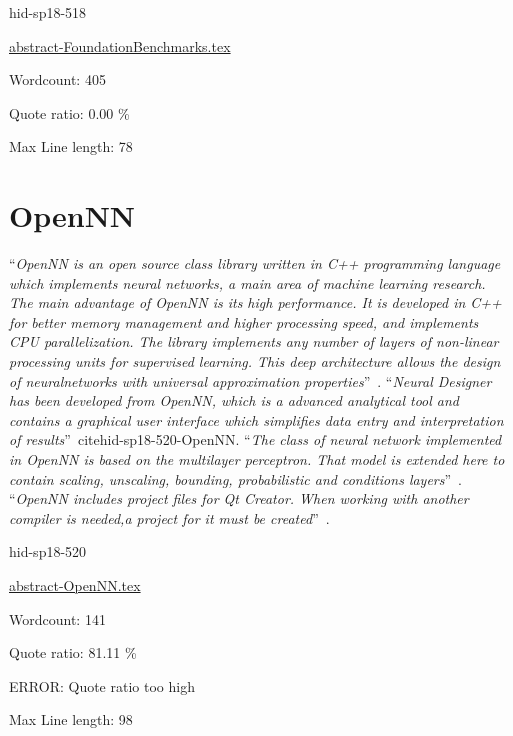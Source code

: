 \begin{IU}

hid-sp18-518

\href{https://github.com/cloudmesh-community/hid-sp18-518/blob/master//technology/abstract-FoundationBenchmarks.tex}{abstract-FoundationBenchmarks.tex}

 

Wordcount: 405


Quote ratio: 0.00 \%
 
Max Line length: 78
\end{IU}

\section{OpenNN}

\color{blue}``\emph{OpenNN is an open source class library written in C++ programming language
which implements neural networks, a main area of machine learning research.
The main advantage of OpenNN is its high performance. It is developed in 
C++ for better memory management and higher processing speed, and 
implements CPU parallelization. The library implements any number of layers
of non-linear processing units for supervised learning. This deep 
architecture allows the design of neuralnetworks with universal approximation
properties}''\color{black}~\cite{hid-sp18-520-OpenNN}.
\color{blue}``\emph{Neural Designer has been developed from OpenNN, which is a advanced analytical
tool and contains a graphical user interface which simplifies data entry
and interpretation of results}''\color{black}~cite{hid-sp18-520-OpenNN}.
\color{blue}``\emph{The class of neural network implemented in OpenNN is based on the multilayer 
perceptron. That model is extended here to contain scaling, unscaling, bounding,
probabilistic and conditions layers}''\color{black}~\cite{hid-sp18-520-OpenNNn}.
\color{blue}``\emph{OpenNN includes project files for Qt Creator. When working with another 
compiler is needed,a project for it must be created}''\color{black}~\cite{hid-sp18-520-OpenNNb}. 



\begin{IU}

hid-sp18-520

\href{https://github.com/cloudmesh-community/hid-sp18-520/blob/master//technology/abstract-OpenNN.tex}{abstract-OpenNN.tex}

 

Wordcount: 141


Quote ratio: 81.11 \%

ERROR: Quote ratio too high
 
Max Line length: 98
\end{IU}

